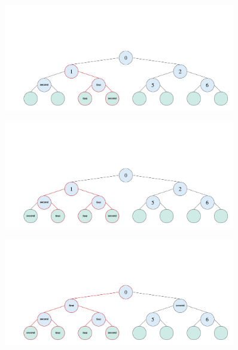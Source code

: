 
\begin{figure}[H]
\centering
\includegraphics[width=0.9\textwidth]{pics/kd-tree-visual/5.png}
\caption{}
\end{figure}


\begin{figure}[H]
\centering
\includegraphics[width=0.9\textwidth]{pics/kd-tree-visual/7.png}
\caption{}
\end{figure}



\begin{figure}[H]
\centering
\includegraphics[width=0.9\textwidth]{pics/kd-tree-visual/10.png}
\caption{}
\end{figure}

